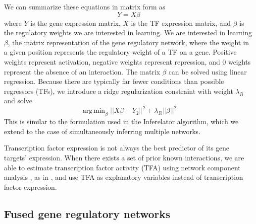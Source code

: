 \documentclass[11pt]{article}
\DeclareMathOperator*{\argmin}{arg\,min}
\begin{document}
\noindent We can summarize these equations in matrix form as
\begin{equation}
Y = X \beta 
\end{equation}
where $Y$ is the gene expression matrix, $X$ is the TF expression matrix, and $\beta$ is the regulatory weights we are interested in learning.
We are interested in learning $\beta$, the matrix representation of the gene regulatory network, where the weight in a given position represents the regulatory weight of a TF on a gene. Positive weights represent activation, negative weights represent repression, and 0 weights represent the absence of an interaction. The matrix $\beta$ can be solved using linear regression. Because there are typically far fewer conditions than possible regressors (TFs), we introduce a ridge regularization constraint with weight $\lambda_R$ and solve
\begin{equation}
\argmin_\beta\vert \vert X\beta - Y_2 \vert \vert ^2 + \lambda_R \vert \vert \beta \vert \vert ^2
\end{equation}
This is similar to the formulation used in the Inferelator algorithm, which we extend to the case of simultaneously inferring multiple networks.

Transcription factor expression is not always the best predictor of its gene targets' expression. When there exists a set of prior known interactions, we are able to estimate transcription factor activity (TFA) using network component analysis \cite{liao2003network}, as in \cite{arrieta-ortiz_experimentally_2015, fu_reconstructing_2011}, and use TFA as explanatory variables instead of transcription factor expression. 

\subsection{Fused gene regulatory networks}
\end{document}
